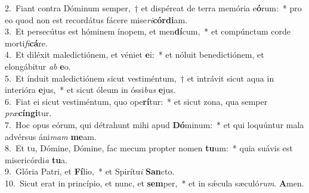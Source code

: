 {2.~}Fiant contra Dóminum semper,~† et dispéreat de terra memória e\textbf{ó}rum:~* pro eo quod non est recordátus fácere mise\textit{ri}\textbf{cór}\textbf{di}am.\\
{3.~}Et persecútus est hóminem ínopem, et men\textbf{dí}cum,~* et compúnctum corde morti\textit{fi}\textbf{cá}re.\\
{4.~}Et diléxit maledictiónem, et véniet \textbf{e}i:~* et nóluit benedictiónem, et elongábitur \textit{ab} \textbf{e}o.\\
{5.~}Et índuit maledictiónem sicut vestiméntum,~† et intrávit sicut aqua in interióra \textbf{e}jus,~* et sicut óleum in óssi\textit{bus} \textbf{e}jus.\\
{6.~}Fiat ei sicut vestiméntum, quo ope\textbf{rí}tur:~* et sicut zona, qua semper \textit{præ}\textbf{cín}\textbf{gi}tur.\\
{7.~}Hoc opus eórum, qui détrahunt mihi apud \textbf{Dó}minum:~* et qui loquúntur mala advérsus áni\textit{mam} \textbf{me}am.\\
{8.~}Et tu, Dómine, Dómine, fac mecum propter nomen \textbf{tu}um:~* quia suávis est misericórdi\textit{a} \textbf{tu}a.\\
{9.~}Glória Patri, et \textbf{Fí}lio,~* et Spirítu\textit{i} \textbf{San}cto.\\
{10.~}Sicut erat in princípio, et nunc, et \textbf{sem}per,~* et in sǽcula sæculó\textit{rum}. \textbf{A}men.\\
